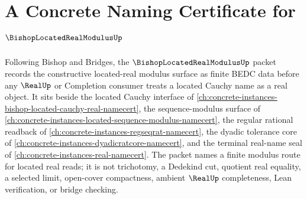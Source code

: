 \chapter{A Concrete Naming Certificate for $\BishopLocatedRealModulusUp$}
\label{ch:concrete-instances-bishop-located-real-modulus-namecert}

Following Bishop and Bridges, the $\BishopLocatedRealModulusUp$ packet records the constructive located-real modulus surface as finite BEDC data before any $\RealUp$ or Completion consumer treats a located Cauchy name as a real object. It sits beside the located Cauchy interface of \autoref{ch:concrete-instances-bishop-located-cauchy-real-namecert}, the sequence-modulus surface of \autoref{ch:concrete-instances-located-sequence-modulus-namecert}, the regular rational readback of \autoref{ch:concrete-instances-regseqrat-namecert}, the dyadic tolerance core of \autoref{ch:concrete-instances-dyadicratcore-namecert}, and the terminal real-name seal of \autoref{ch:concrete-instances-real-namecert}. The packet names a finite modulus route for located real reads; it is not trichotomy, a Dedekind cut, quotient real equality, a selected limit, open-cover compactness, ambient $\RealUp$ completeness, Lean verification, or bridge checking.

